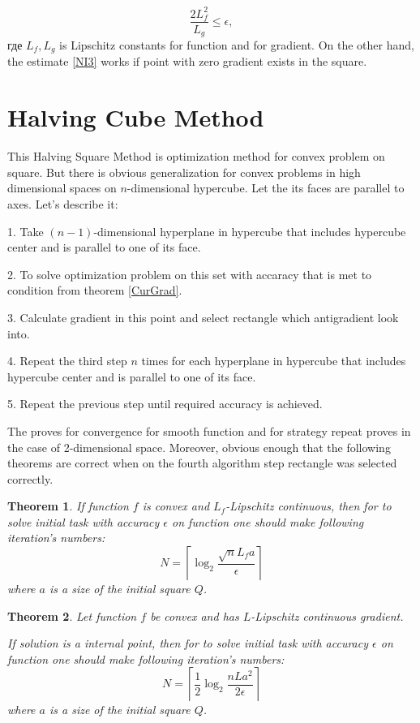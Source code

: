 \documentclass[12pt]{article}
\newtheorem{theorem}{Theorem}[section]
\begin{document}
$$\frac{2L_f^2}{L_g}\leq \epsilon,$$
где $L_f, L_g$ is Lipschitz constants for function and for gradient. On the other hand, the estimate \ref{NI3} works if point with zero gradient exists in the square. 

\section{Halving Cube Method}

This Halving Square Method is optimization method for convex problem on square. But there is obvious generalization for convex problems in high dimensional spaces on $n$-dimensional hypercube. Let the its faces are parallel to axes. Let's describe it:

1. Take $(n-1)$-dimensional hyperplane in hypercube that includes hypercube center and is parallel to one of its face.

2. To solve optimization problem on this set with accaracy that is met to condition from theorem \ref{CurGrad}.

3. Calculate gradient in this point and select rectangle which antigradient look into.

4. Repeat the third step $n$ times for each hyperplane in hypercube that includes hypercube center and is parallel to one of its face.

5. Repeat the previous step until required accuracy is achieved.

The proves for convergence for smooth function and for strategy repeat proves in the case of 2-dimensional space. Moreover, obvious enough that the following theorems are correct when on the fourth algorithm step rectangle was selected correctly.

\begin{theorem}
If function $f$ is convex and $L_f$-Lipschitz continuous, then for to solve initial task with accuracy $\epsilon$ on function one should make following iteration's numbers:
\begin{equation}\label{NI1}N = \left\lceil\log_2\frac{\sqrt{n}L_fa}{\epsilon}\right\rceil\end{equation}
where $a$ is a size of the initial square $Q$.
\end{theorem}

\begin{theorem}
Let function $f$ be convex and has $L$-Lipschitz continuous gradient.

If solution is a internal point, then for to solve initial task with accuracy $\epsilon$ on function one should make following iteration's numbers:
\begin{equation}N = \left\lceil\frac{1}{2}\log_2\frac{nLa^2}{2\epsilon}\right\rceil\end{equation}
where $a$ is a size of the initial square $Q$.
\end{theorem}
\end{document}
